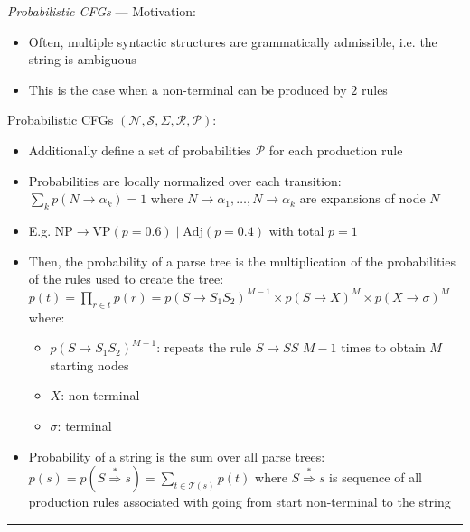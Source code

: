 \emph{Probabilistic CFGs} ---
Motivation:
\begin{itemize}
    \item Often, multiple syntactic structures are grammatically admissible, i.e. the string is ambiguous
    \item This is the case when a non-terminal can be produced by $2$ rules
\end{itemize}
Probabilistic CFGs $(\mathcal{N}, \mathcal{S}, \Sigma, \mathcal{R}, \mathcal{P})$:
\begin{itemize}
    \item Additionally define a set of probabilities $\mathcal{P}$ for each production rule
    \item Probabilities are locally normalized over each transition:
    $
    \sum_{k} p(N \to \alpha_k) = 1
    $
    where $N \to \alpha_1, \dots, N \to \alpha_k$ are expansions of node $N$
    \item E.g.
    $
    \text{NP} \to \text{VP} (p = 0.6) \mid \text{Adj} (p = 0.4)
    $
    with total $p = 1$
    \item Then, the probability of a parse tree is the multiplication of the probabilities of the rules used to create the tree:
    $
    p(t) = \prod_{r \in t} p(r) = p(S \to S_1 S_2)^{M-1} \times p(S \to X)^M \times p(X \to \sigma)^M
    $
    where:
    \begin{itemize}
        \item $p(S \to S_1 S_2)^{M-1}$: repeats the rule $S \to SS$ $M-1$ times to obtain $M$ starting nodes
        \item $X$: non-terminal
        \item $\sigma$: terminal
    \end{itemize}
    \item Probability of a string is the sum over all parse trees: $p(s) = p(S \stackrel{*}{\Rightarrow} s) = \sum_{t \in \mathcal{T}(s)} p(t)$ where $S \stackrel{*}{\Rightarrow} s$ is sequence of all production rules associated with going from start non-terminal to the string
\end{itemize}

{\color{lightgray}\hrule height 0.001mm}


